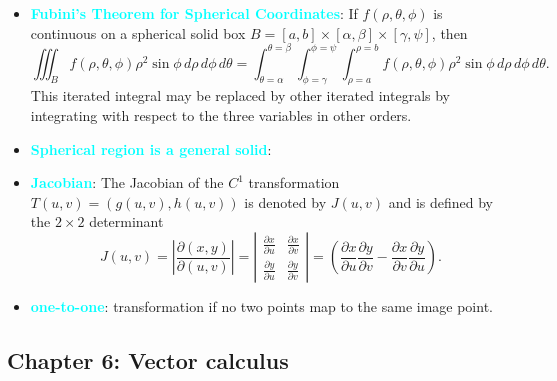 \documentclass{report}
\begin{document}
\begin{itemize}
        \bigbreak \noindent 
    \item \textbf{\textcolor{cyan}{Fubini’s Theorem for Spherical Coordinates}}:
        If \(f(\rho, \theta, \phi)\) is continuous on a spherical solid box \(B = [a,b] \times [\alpha,\beta] \times [\gamma,\psi]\), then
        \[
            \iiint_B f(\rho, \theta, \phi) \rho^2 \sin \phi \, d\rho \, d\phi \, d\theta = \int_{\theta=\alpha}^{\theta=\beta} \int_{\phi=\gamma}^{\phi=\psi} \int_{\rho=a}^{\rho=b} f(\rho, \theta, \phi) \rho^2 \sin \phi \, d\rho \, d\phi \, d\theta.
        \]
        This iterated integral may be replaced by other iterated integrals by integrating with respect to the three variables in other orders.
    \item \textbf{\textcolor{cyan}{Spherical region is a general solid}}:
    \item \textbf{\textcolor{cyan}{Jacobian}}:
            The Jacobian of the \(C^1\) transformation \(T(u,v) = (g(u,v), h(u,v))\) is denoted by \(J(u,v)\) and is defined by the \(2 \times 2\) determinant
            \[
                J(u,v) = \left| \frac{\partial(x,y)}{\partial(u,v)} \right| = \left| \begin{array}{cc}
                    \frac{\partial x}{\partial u} & \frac{\partial x}{\partial v} \\
                    \frac{\partial y}{\partial u} & \frac{\partial y}{\partial v}
                \end{array} \right| = \left( \frac{\partial x}{\partial u} \frac{\partial y}{\partial v} - \frac{\partial x}{\partial v} \frac{\partial y}{\partial u} \right).
            \]
        \item \textbf{\textcolor{cyan}{one-to-one}}: transformation if no two points map to the same image point.
    \end{itemize}

    \pagebreak 
    \subsection{Chapter 6: Vector calculus}
    \bigbreak \noindent 
\end{document}
